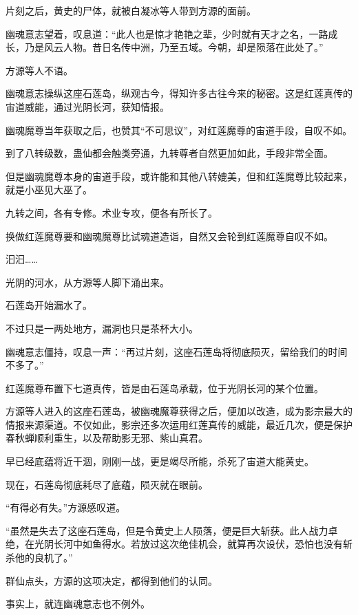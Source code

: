 
\begin{this_body}

片刻之后，黄史的尸体，就被白凝冰等人带到方源的面前。

幽魂意志望着，叹息道：“此人也是惊才艳艳之辈，少时就有天才之名，一路成长，乃是风云人物。昔日名传中洲，乃至五域。今朝，却是陨落在此处了。”

方源等人不语。

幽魂意志操纵这座石莲岛，纵观古今，得知许多古往今来的秘密。这是红莲真传的宙道威能，通过光阴长河，获知情报。

幽魂魔尊当年获取之后，也赞其“不可思议”，对红莲魔尊的宙道手段，自叹不如。

到了八转级数，蛊仙都会触类旁通，九转尊者自然更加如此，手段非常全面。

但是幽魂魔尊本身的宙道手段，或许能和其他八转媲美，但和红莲魔尊比较起来，就是小巫见大巫了。

九转之间，各有专修。术业专攻，便各有所长了。

换做红莲魔尊要和幽魂魔尊比试魂道造诣，自然又会轮到红莲魔尊自叹不如。

汩汩……

光阴的河水，从方源等人脚下涌出来。

石莲岛开始漏水了。

不过只是一两处地方，漏洞也只是茶杯大小。

幽魂意志僵持，叹息一声：“再过片刻，这座石莲岛将彻底陨灭，留给我们的时间不多了。”

红莲魔尊布置下七道真传，皆是由石莲岛承载，位于光阴长河的某个位置。

方源等人进入的这座石莲岛，被幽魂魔尊获得之后，便加以改造，成为影宗最大的情报来源渠道。不仅如此，影宗还多次运用红莲真传的威能，最近几次，便是保护春秋蝉顺利重生，以及帮助影无邪、紫山真君。

早已经底蕴将近干涸，刚刚一战，更是竭尽所能，杀死了宙道大能黄史。

现在，石莲岛彻底耗尽了底蕴，陨灭就在眼前。

“有得必有失。”方源感叹道。

“虽然是失去了这座石莲岛，但是令黄史上人陨落，便是巨大斩获。此人战力卓绝，在光阴长河中如鱼得水。若放过这次绝佳机会，就算再次设伏，恐怕也没有斩杀他的良机了。”

群仙点头，方源的这项决定，都得到他们的认同。

事实上，就连幽魂意志也不例外。


\end{this_body}
